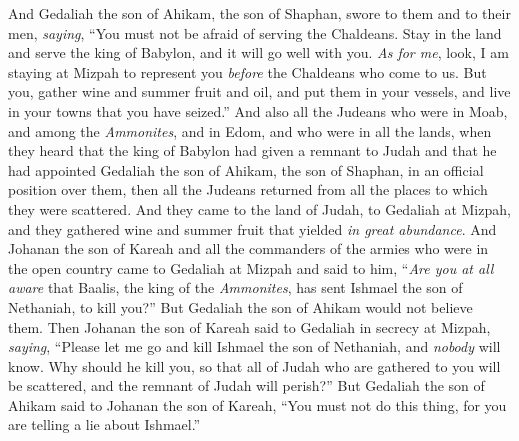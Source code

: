 \begin{biblechapter}
\verse And Gedaliah the son of Ahikam, the son of Shaphan, swore to them and to their men, \textit{saying}, “You must not be afraid of serving the Chaldeans. Stay in the land and serve the king of Babylon, and it will go well with you.
\verse \textit{As for me}, look, I am staying at Mizpah to represent you \textit{before} the Chaldeans who come to us. But you, gather wine and summer fruit and oil, and put them in your vessels, and live in your towns that you have seized.”
\verse And also all the Judeans who were in Moab, and among the \textit{Ammonites}, and in Edom, and who were in all the lands, when they heard that the king of Babylon had given a remnant to Judah and that he had appointed Gedaliah the son of Ahikam, the son of Shaphan, in an official position over them,
\verse then all the Judeans returned from all the places to which they were scattered. And they came to the land of Judah, to Gedaliah at Mizpah, and they gathered wine and summer fruit that yielded \textit{in great abundance}.
\verse And Johanan the son of Kareah and all the commanders of the armies who were in the open country came to Gedaliah at Mizpah
\verse and said to him, “\textit{Are you at all aware} that Baalis, the king of the \textit{Ammonites}, has sent Ishmael the son of Nethaniah, to kill you?” But Gedaliah the son of Ahikam would not believe them.
\verse Then Johanan the son of Kareah said to Gedaliah in secrecy at Mizpah, \textit{saying}, “Please let me go and kill Ishmael the son of Nethaniah, and \textit{nobody} will know. Why should he kill you, so that all of Judah who are gathered to you will be scattered, and the remnant of Judah will perish?”
\verse But Gedaliah the son of Ahikam said to Johanan the son of Kareah, “You must not do this thing, for you are telling a lie about Ishmael.”
\end{biblechapter}


